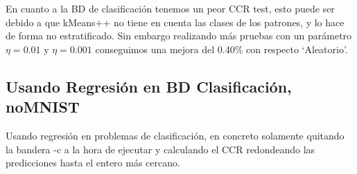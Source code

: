 \begin{table}[H]
\centering
\vspace{1ex}
\small
{}
\caption{Comparación entre iniciación aleatoria y kmeans++ en BD clasificación}
\label{table:tablacomparacionkmeans++2}
\end{table}

En cuanto a la BD de clasificación tenemos un peor CCR test, esto puede ser debido a que kMeans++ no tiene en cuenta las clases de los patrones, y lo hace de forma no estratificado. Sin embargo realizando más pruebas con un parámetro $\eta = 0.01$ y $\eta = 0.001$ conseguimos una mejora del 0.40\% con respecto `Aleatorio'.

\subsection{Usando Regresión en BD Clasificación, noMNIST}
Usando regresión en problemas de clasificación, en concreto solamente quitando la bandera -c a la hora de ejecutar y calculando el CCR redondeando las predicciones hasta el entero más cercano.

\begin{table}[H]
\centering
\vspace{1ex}
\small
{}
\caption{Regresión BD noMNIST}
\label{table:tabla_regresion_en_clasificacion}
\end{table}

